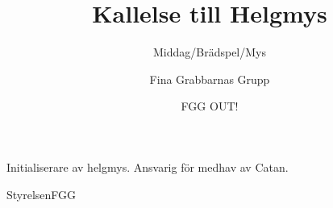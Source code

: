 \documentclass{fgg}
\title{Kallelse till Helgmys}
\subtitle{Middag/Brädspel/Mys}
\author{Fina Grabbarnas Grupp}
\date{\formatdate{14}{11}{2020}}
\begin{document}
\makehf
\maketitle

\begin{protokoll}
	Initialiserare av helgmys.
	Ansvarig för medhav av Catan.
\end{protokoll}

\signature{FGG OUT!}{Styrelsen}{FGG}
\end{document}
